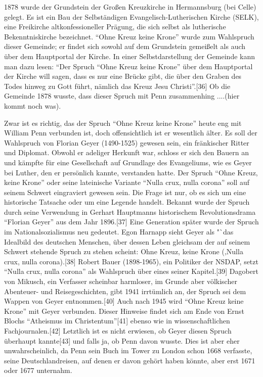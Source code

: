 \medskip

1878 wurde der Grundstein der Großen Kreuzkirche in Hermannsburg (bei Celle)
gelegt. Es ist ein Bau der Selbständigen Evangelisch-Lutherischen Kirche (SELK),
eine Freikirche altkonfessioneller Prägung, die sich selbst als lutherische
Bekenntniskirche bezeichnet. "`Ohne Kreuz keine Krone"' wurde zum Wahlspruch
dieser Gemeinde; er findet sich sowohl auf dem Grundstein gemeißelt als auch
über dem Hauptportal der Kirche. In einer Selbstdarstellung der Gemeinde kann
man dazu lesen: "`Der Spruch "`Ohne Kreuz keine Krone"' über dem Hauptportal der
Kirche will sagen, dass es nur eine Brücke gibt, die über den Graben des Todes
hinweg zu Gott führt, nämlich das Kreuz Jesu Christi"'.[36] Ob die Gemeinde 1878
wusste, dass dieser Spruch mit Penn zusammenhing ....(hier kommt noch was).

\medskip

Zwar ist es richtig, das der Spruch "`Ohne Kreuz keine Krone"' heute eng mit
William Penn verbunden ist, doch offensichtlich ist er wesentlich älter. Es soll
der Wahlspruch von Florian Geyer (1490-1525) gewesen sein, ein fränkischer
Ritter und Diplomat. Obwohl er adeliger Herkunft war, schloss er sich den Bauern
an und kämpfte für eine Gesellschaft auf Grundlage des Evangeliums, wie es Geyer
bei Luther, den er persönlich kannte, verstanden hatte. Der Spruch "`Ohne Kreuz,
keine Krone"' oder seine lateinische Variante "`Nulla crux, nulla corona"' soll
auf seinem Schwert eingraviert gewesen sein. Die Frage ist nur, ob es sich um
eine historische Tatsache oder um eine Legende handelt. Bekannt wurde der Spruch
durch seine Verwendung in Gerhart Hauptmanns historischem Revolutionsdrama
"`Florian Geyer"' aus dem Jahr 1896.[37] Eine Generation später wurde der Spruch
im Nationalsozialismus neu gedeutet. Egon Harnapp sieht Geyer als "`das
Idealbild des deutschen Menschen, über dessen Leben gleichsam der auf seinem
Schwert stehende Spruch zu stehen scheint: Ohne Kreuz, keine Krone (‚Nulla crux,
nulla corona).[38] Robert Bauer (1898-1965), ein Politiker der NSDAP, setzt
"`Nulla crux, nulla corona"' als Wahlspruch über eines seiner Kapitel.[39]
Dagobert von Mikusch, ein Verfasser scheinbar harmloser, im Grunde aber
völkischer Abenteuer- und Reisegeschichten, gibt 1941 irrtümlich an, der Spruch
sei dem Wappen von Geyer entnommen.[40] Auch nach 1945 wird "`Ohne Kreuz keine
Krone"' mit Geyer verbunden. Dieser Hinweise findet sich am Ende von Ernst
Blochs "`Atheismus im Christentum"'[41] ebenso wie in wissenschaftlichen
Fachjournalen.[42] Letztlich ist es nicht erwiesen, ob Geyer diesen Spruch
überhaupt kannte[43] und falls ja, ob Penn davon wusste. Dies ist aber eher
unwahrscheinlich, da Penn sein Buch im Tower zu London schon 1668 verfasste,
seine Deutschlandreisen, auf denen er davon gehört haben könnte, aber erst 1671
oder 1677 unternahm.

